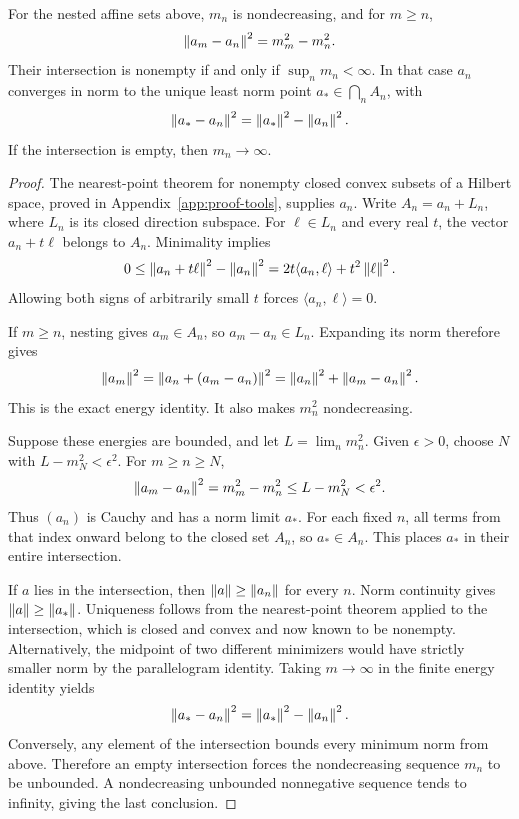 \begin{theorem}\label{WR02}
For the nested affine sets above, $m_n$ is nondecreasing, and for $m\ge n$,
\begin{equation}\label{eq:nested-energy}
 \left\lVert a_m-a_n\right\rVert^2=m_m^2-m_n^2.
\end{equation}
Their intersection is nonempty if and only if $\sup_n m_n<\infty$. In that case $a_n$ converges in norm to the unique least norm point $a_*\in\bigcap_n A_n$, with
\[
 \left\lVert a_*-a_n\right\rVert^2=\left\lVert a_*\right\rVert^2-\left\lVert a_n\right\rVert^2.
\]
If the intersection is empty, then $m_n\to\infty$.
\end{theorem}
\begin{proof}
The nearest-point theorem for nonempty closed convex subsets of a Hilbert space, proved in Appendix~\ref{app:proof-tools}, supplies $a_n$. Write $A_n=a_n+L_n$, where $L_n$ is its closed direction subspace. For $\ell\in L_n$ and every real $t$, the vector $a_n+t\ell$ belongs to $A_n$. Minimality implies
\[
 0\le\left\lVert a_n+t\ell\right\rVert^2-\left\lVert a_n\right\rVert^2
 =2t\langle a_n,\ell\rangle+t^2\left\lVert\ell\right\rVert^2.
\]
Allowing both signs of arbitrarily small $t$ forces $\langle a_n,\ell\rangle=0$.

If $m\ge n$, nesting gives $a_m\in A_n$, so $a_m-a_n\in L_n$. Expanding its norm therefore gives
\[
 \left\lVert a_m\right\rVert^2
 =\left\lVert a_n+(a_m-a_n)\right\rVert^2
 =\left\lVert a_n\right\rVert^2+\left\lVert a_m-a_n\right\rVert^2.
\]
This is the exact energy identity. It also makes $m_n^2$ nondecreasing.

Suppose these energies are bounded, and let $L=\lim_n m_n^2$. Given $\epsilon>0$, choose $N$ with $L-m_N^2<\epsilon^2$. For $m\ge n\ge N$,
\[
 \left\lVert a_m-a_n\right\rVert^2=m_m^2-m_n^2\le L-m_N^2<\epsilon^2.
\]
Thus $(a_n)$ is Cauchy and has a norm limit $a_*$. For each fixed $n$, all terms from that index onward belong to the closed set $A_n$, so $a_*\in A_n$. This places $a_*$ in their entire intersection.

If $a$ lies in the intersection, then $\left\lVert a\right\rVert\ge\left\lVert a_n\right\rVert$ for every $n$. Norm continuity gives $\left\lVert a\right\rVert\ge\left\lVert a_*\right\rVert$. Uniqueness follows from the nearest-point theorem applied to the intersection, which is closed and convex and now known to be nonempty. Alternatively, the midpoint of two different minimizers would have strictly smaller norm by the parallelogram identity. Taking $m\to\infty$ in the finite energy identity yields
\[
 \left\lVert a_*-a_n\right\rVert^2=\left\lVert a_*\right\rVert^2-\left\lVert a_n\right\rVert^2.
\]
Conversely, any element of the intersection bounds every minimum norm from above. Therefore an empty intersection forces the nondecreasing sequence $m_n$ to be unbounded. A nondecreasing unbounded nonnegative sequence tends to infinity, giving the last conclusion.
\end{proof}

